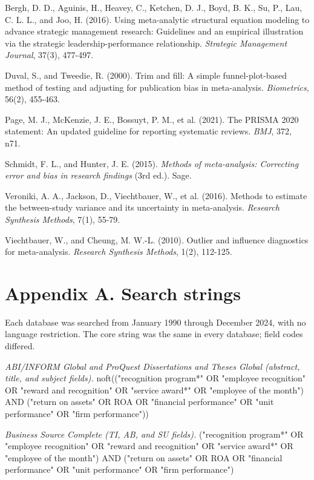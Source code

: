 \documentclass[11pt]{article}
\begin{document}
{\small
\begin{description}\setlength{\itemsep}{2pt}\setlength{\labelwidth}{0pt}\setlength{\leftmargin}{1.5em}
\item[] Bergh, D. D., Aguinis, H., Heavey, C., Ketchen, D. J., Boyd, B. K., Su, P., Lau, C. L. L., and Joo, H. (2016). Using meta-analytic structural equation modeling to advance strategic management research: Guidelines and an empirical illustration via the strategic leadership-performance relationship. \textit{Strategic Management Journal}, 37(3), 477-497.
\item[] Duval, S., and Tweedie, R. (2000). Trim and fill: A simple funnel-plot-based method of testing and adjusting for publication bias in meta-analysis. \textit{Biometrics}, 56(2), 455-463.
\item[] Page, M. J., McKenzie, J. E., Bossuyt, P. M., et al. (2021). The PRISMA 2020 statement: An updated guideline for reporting systematic reviews. \textit{BMJ}, 372, n71.
\item[] Schmidt, F. L., and Hunter, J. E. (2015). \textit{Methods of meta-analysis: Correcting error and bias in research findings} (3rd ed.). Sage.
\item[] Veroniki, A. A., Jackson, D., Viechtbauer, W., et al. (2016). Methods to estimate the between-study variance and its uncertainty in meta-analysis. \textit{Research Synthesis Methods}, 7(1), 55-79.
\item[] Viechtbauer, W., and Cheung, M. W.-L. (2010). Outlier and influence diagnostics for meta-analysis. \textit{Research Synthesis Methods}, 1(2), 112-125.
\end{description}
}

\appendix
\section*{Appendix A. Search strings}

Each database was searched from January 1990 through December 2024, with no language restriction. The core string was the same in every database; field codes differed.

\noindent\textit{ABI/INFORM Global and ProQuest Dissertations and Theses Global (abstract, title, and subject fields).} noft(("recognition program*" OR "employee recognition" OR "reward and recognition" OR "service award*" OR "employee of the month") AND ("return on assets" OR ROA OR "financial performance" OR "unit performance" OR "firm performance"))

\noindent\textit{Business Source Complete (TI, AB, and SU fields).} ("recognition program*" OR "employee recognition" OR "reward and recognition" OR "service award*" OR "employee of the month") AND ("return on assets" OR ROA OR "financial performance" OR "unit performance" OR "firm performance")
\end{document}
